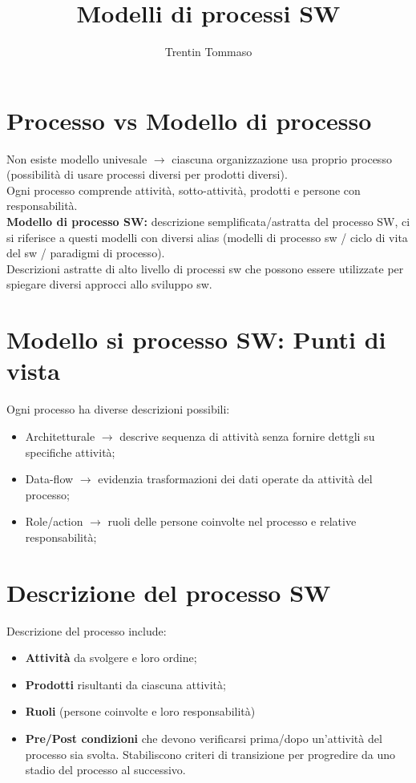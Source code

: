 \documentclass{article}
\title{Modelli di processi SW}
\author{Trentin Tommaso}
\begin{document}
  \maketitle
  \tableofcontents
  \newpage

  \section{Processo vs Modello di processo}
    Non esiste modello univesale $\rightarrow$ ciascuna organizzazione usa proprio processo (possibilità di usare processi diversi per prodotti diversi).\\
    Ogni processo comprende attività, sotto-attività, prodotti e persone con responsabilità.\\
    \textbf{Modello di processo SW:} descrizione semplificata/astratta del processo SW, ci si riferisce a questi modelli con diversi alias (modelli di processo sw / ciclo di vita del sw / paradigmi di processo).\\
    Descrizioni astratte di alto livello di processi sw che possono essere utilizzate per spiegare diversi approcci allo sviluppo sw.\\
  \section{Modello si processo SW: Punti di vista}
    Ogni processo ha diverse descrizioni possibili:
    \begin{itemize}
      \item Architetturale $\rightarrow$ descrive sequenza di attività senza fornire dettgli su specifiche attività;
      \item Data-flow $\rightarrow$ evidenzia trasformazioni dei dati operate da attività del processo;
      \item Role/action $\rightarrow$ ruoli delle persone coinvolte nel processo e relative responsabilità;
    \end{itemize}
  \section{Descrizione del processo SW}
    Descrizione del processo include:
    \begin{itemize}
      \item \textbf{Attività} da svolgere e loro ordine;
      \item \textbf{Prodotti} risultanti da ciascuna attività;
      \item \textbf{Ruoli} (persone coinvolte e loro responsabilità)
      \item \textbf{Pre/Post condizioni} che devono verificarsi prima/dopo un'attività del processo sia svolta. Stabiliscono criteri di transizione per progredire da uno stadio del processo al successivo.
    \end{itemize}
\end{document}
